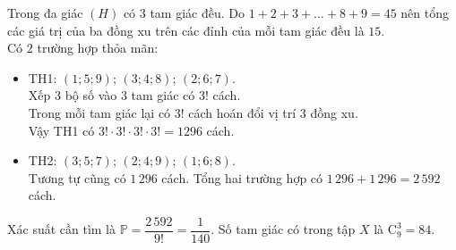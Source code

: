 \begin{ex}
{\begin{itemchoice}
			\itemch 
			
			Trong đa giác $(H)$ có $3$ tam giác đều. Do $1+2+3+\dots+8+9 = 45$ nên tổng các giá trị của ba đồng xu trên các đỉnh của mỗi tam giác đều là $15$.\\
			Có $2$ trường hợp thỏa mãn:
			\begin{itemize}
				\item TH1: $(1; 5; 9)$; $(3; 4; 8)$; $(2; 6; 7)$.\\
				Xếp $3$ bộ số vào $3$ tam giác có $3!$ cách.\\
				Trong mỗi tam giác lại có $3!$ cách hoán đổi vị trí $3$ đồng xu.\\
				Vậy TH1 có $3! \cdot 3! \cdot 3! \cdot 3! = 1296$ cách.
				\item 	TH2: $(3; 5; 7)$; $(2; 4; 9)$; $(1; 6; 8)$.\\
				Tương tự cũng có $1\,296$ cách. Tổng hai trường hợp có $1\,296 + 1\,296 = 2\,592$ cách.
			\end{itemize}
			Xác suất cần tìm là $\mathbb{P} = \dfrac{2\,592}{9!} = \dfrac{1}{140}$.
			\itemch
			Số tam giác có trong tập $X$ là $\mathrm{C}_9^3 = 84$.
		\end{itemchoice}
	}
\end{ex}

